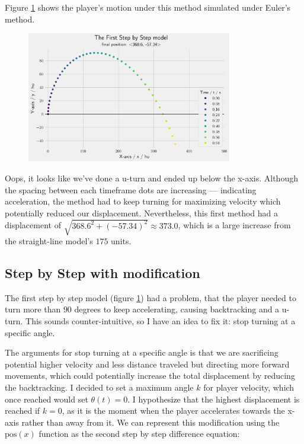 Figure \ref{fig:1sbs} shows the player's motion under this method simulated under Euler's method.

\begin{figure}[H]
    \centering
    \includegraphics[width=0.8\textwidth]{assets/step_by_step_1.png}
    \caption{}
    \label{fig:1sbs}
\end{figure}

Oops, it looks like we've done a u-turn and ended up below the x-axis. Although the spacing between each timeframe dots are increasing --- indicating acceleration, the method had to keep turning for maximizing velocity which potentially reduced our displacement. Nevertheless, this first method had a displacement of $\sqrt{368.6^2 + (-57.34)^2} \approx 373.0$, which is a large increase from the straight-line model's $175$ units.

\subsection{Step by Step with modification}
The first step by step model (figure \ref{fig:1sbs}) had a problem, that the player needed to turn more than $90$ degrees to keep accelerating, causing backtracking and a u-turn. This sounds counter-intuitive, so I have an idea to fix it: stop turning at a specific angle.

The arguments for stop turning at a specific angle is that we are sacrificing potential higher velocity and less distance traveled but directing more forward movements, which could potentially increase the total displacement by reducing the backtracking. I decided to set a maximum angle $k$ for player velocity, which once reached would set $\theta(t) = 0$. I hypothesize that the highest displacement is reached if $k=0$, as it is the moment when the player accelerates towards the x-axis rather than away from it. We can represent this modification using the $\text{pos}(x)$ function as the second step by step difference equation:

